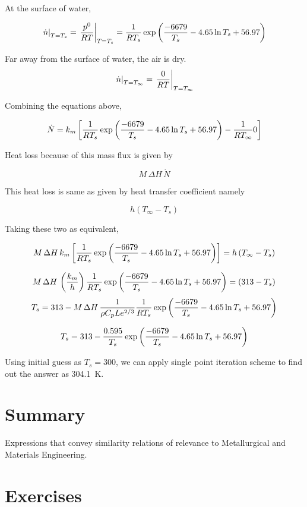 At the surface of water, 

$$ \left. \dot{n}\right|_{T=T_s} =  \left. {p^0 \over RT} \right|_{T=T_s} = {1 \over R T_s} \exp \left( {-6679 \over T_s} - 4.65 \ln T_s + 56.97 \right)$$

Far away from the surface of water, the air is dry.
$$ \left. \dot{n}\right|_{T=T_\infty} =  \left. {0 \over RT} \right|_{T=T_\infty} $$

Combining the equations above,

$$ \dot{N} = k_m \left[ {1 \over R T_s}\exp \left( {-6679 \over T_s} - 4.65 \ln T_s + 56.97 \right) - {1 \over R T_\infty} 0\right]$$

Heat loss because of this mass flux is given by

$$ M \, \Delta H \, \dot{N} $$

This heat loss is same as given by heat transfer coefficient namely

$$ h \left( T_\infty - T_s \right) $$

Taking these two as equivalent,

$$ M \, \Delta H \,  k_m \left[ {1 \over R T_s} \exp \left( {-6679 \over T_s} - 4.65 \ln T_s + 56.97 \right) \right] = h \left( T_\infty - T_s \right) $$

$$ M \, \Delta H \, \left({k_m \over h}\right) {1 \over R T_s} \exp \left( {-6679 \over T_s} - 4.65 \ln T_s + 56.97 \right) = \left( 313 - T_s \right) $$
$$ T_s = 313 - M \, \Delta H \, {1 \over \rho C_p Le^{2/3}} {1 \over R T_s} \exp \left( {-6679 \over T_s} - 4.65 \ln T_s + 56.97 \right) $$

$$ T_s = 313 - {0.595 \over T_s} \exp \left( {-6679 \over T_s} - 4.65 \ln T_s + 56.97 \right) $$

Using initial guess as $T_s = 300$, we can apply single point iteration scheme to find out the answer as \SI{304.1}{\kelvin}.


\section{Summary}

Expressions that convey similarity relations of relevance to Metallurgical and Materials Engineering.


\section{Exercises}

